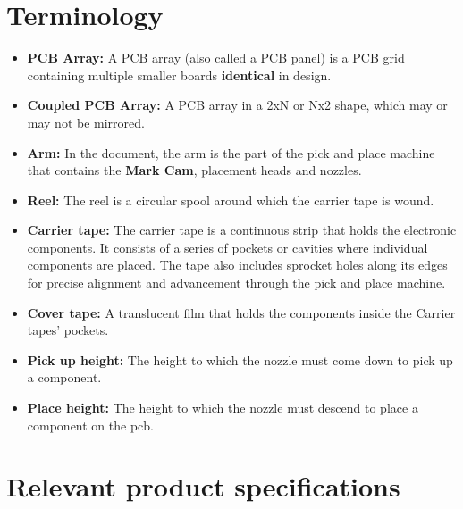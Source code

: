 \documentclass[a4paper,10pt]{report}
\begin{document}
\section{Terminology}
\begin{itemize}
 \item \textbf{PCB Array: } A PCB array (also called a PCB panel) is a PCB  grid containing multiple smaller boards \textbf{identical} in design.
 \item \textbf{Coupled PCB Array: } A PCB array in a 2xN or Nx2 shape, which may or may not be mirrored.
 \item \textbf{Arm: } In the document, the arm is the part of the pick and place machine that contains the \textbf{Mark Cam}, placement heads and nozzles.
 \item \textbf{Reel: } The reel is a circular spool around which the carrier tape is wound.
 \item \textbf{Carrier tape: }  The carrier tape is a continuous strip that holds the electronic components. It consists of a series of pockets or cavities where individual components are placed. The tape also includes sprocket holes along its edges for precise alignment and advancement through the pick and place machine.
 \item \textbf{Cover tape: } A translucent film that holds the components inside the Carrier tapes' pockets.
 \item \textbf{Pick up height: } The height to which the nozzle must come down to pick up a component.
  \item \textbf{Place height: } The height to which the nozzle must descend to place a component on the pcb.
\end{itemize}
\newpage

\section{Relevant product specifications}
\end{document}
